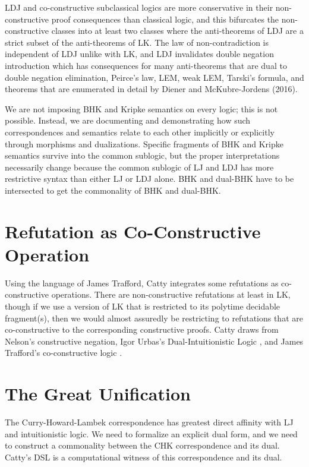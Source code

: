 LDJ and co-constructive subclassical logics are more conservative in their non-constructive proof consequences than classical logic, and this bifurcates the non-constructive classes into at least two classes where the anti-theorems of LDJ are a strict subset of the anti-theorems of LK. The law of non-contradiction is independent of LDJ unlike with LK, and LDJ invalidates double negation introduction which has consequences for many anti-theorems that are dual to double negation elimination, Peirce's law, LEM, weak LEM, Tarski's formula, and theorems that are enumerated in detail by Diener and McKubre-Jordens (2016).

We are not imposing BHK and Kripke semantics on every logic; this is not possible. Instead, we are documenting and demonstrating how such correspondences and semantics relate to each other implicitly or explicitly through morphisms and dualizations. Specific fragments of BHK and Kripke semantics survive into the common sublogic, but the proper interpretations necessarily change because the common sublogic of LJ and LDJ has more restrictive syntax than either LJ or LDJ alone. BHK and dual-BHK have to be intersected to get the commonality of BHK and dual-BHK.

\section*{Refutation as Co-Constructive Operation}
Using the language of James Trafford, Catty integrates some refutations as co-constructive operations. There are non-constructive refutations at least in LK, though if we use a version of LK that is restricted to its polytime decidable fragment(s), then we would almost assuredly be restricting to refutations that are co-constructive to the corresponding constructive proofs. Catty draws from Nelson's constructive negation, Igor Urbas's Dual-Intuitionistic Logic \cite{urbas1996dual}, and James Trafford's co-constructive logic \cite{trafford2015coconstructive}.

\section*{The Great Unification}
The Curry-Howard-Lambek correspondence has greatest direct affinity with LJ and intuitionistic logic. We need to formalize an explicit dual form, and we need to construct a commonality between the CHK correspondence and its dual. Catty's DSL is a computational witness of this correspondence and its dual.

